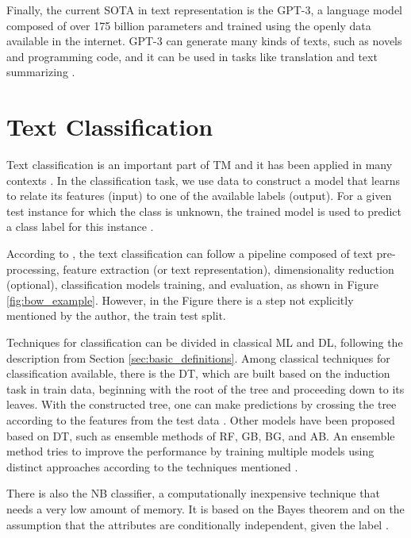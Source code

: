 Finally, the current \gls{SOTA} in text representation is the \gls{GPT-3}, a language model composed of over 175 billion parameters and trained using the openly data available in the internet. \gls{GPT-3} can generate many kinds of texts, such as novels and programming code, and it can be used in tasks like translation and  text summarizing \cite{Brown2020}.
    


\section{Text Classification}



Text classification is an important part of \gls{TM} and it has been applied in many contexts \cite{Cardoso2018,Kumar2015,Sheikhalishahi2019}.
In the classification task, we use data to construct a model that learns to relate its features (input) to one of the available  labels (output).
For a given test instance for which the class is unknown, the trained model is used to predict a class label for this instance \cite{Aggarwal2013}.

According to  \textcite{Kowsari2019}, the text classification can follow a pipeline composed of text pre-processing, feature extraction (or text representation), dimensionality reduction (optional), classification models training, and evaluation, as shown in Figure \ref{fig:bow_example}. However, in the Figure there is a step not explicitly mentioned by the author, the train test split.

Techniques for classification can be divided in classical \gls{ML} and \gls{DL}, following the description from Section \ref{sec:basic_definitions}. 
Among classical techniques for classification available, there is the \gls{DT}, which are built based on the induction task in train data, beginning with the root of the tree and proceeding down to its leaves. With the constructed tree, one can make predictions by crossing the tree according to the features from the test data \cite{Quinlan1986}. Other models have been proposed based on \gls{DT}, such as ensemble methods of  \gls{RF}, \gls{GB}, \gls{BG}, and \gls{AB}. An ensemble method tries to improve the performance by training multiple models using distinct approaches according to the techniques mentioned \cite{Breiman2001, Friedman2001, Breiman1996, Schapire1999}.

There is also the \gls{NB} classifier, a computationally inexpensive technique that needs a very low amount of memory. It is based on the Bayes theorem and on the assumption that the attributes are conditionally independent, given the label \cite{Kowsari2019, Pearson1925}.

